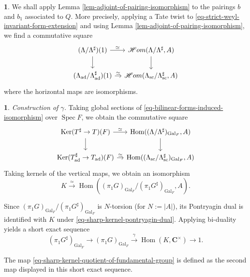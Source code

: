 \documentclass[10pt,english,reqno]{amsart}
\newcommand{\complexes}{\mathbf C}
\newcommand{\Gal}{\operatorname{Gal}}
\newcommand{\Hom}{\operatorname{Hom}}
\newcommand{\SHom}{\mathscr{H}om}
\newcommand{\Ker}{\mathrm{Ker}}
\newcommand{\Spec}{\operatorname{Spec}}
\newcommand{\sconn}{\textnormal{sc}}
\newcommand{\adjoint}{\textnormal{ad}}
\theoremstyle{definition}
\numberwithin{equation}{section}
\newtheorem{untitledsubsubsection}[subsubsection]{}
\newenvironment{void}
{\begin{untitledsubsubsection}}
{\end{untitledsubsubsection}}
\begin{document}

\begin{void}
We shall apply Lemma \ref{lem-adjoint-of-pairing-isomorphism} to the pairings $b$ and $b_1$ associated to $Q$. More precisely, applying a Tate twist to \eqref{eq-strict-weyl-invariant-form-extension} and using Lemma \ref{lem-adjoint-of-pairing-isomorphism}, we find a commutative square
\begin{equation}
\label{eq-bilinear-forms-induced-isomorphism}
\begin{tikzcd}[column sep = 1em]
	(\Lambda/\Lambda^{\sharp})(1) \ar[r, "\simeq"]\ar[d] & \SHom(\Lambda/\Lambda^{\sharp}, A) \ar[d] \\
	(\Lambda_{\adjoint}/\Lambda^{\sharp}_{\adjoint})(1) \ar[r, "\simeq"] & \SHom(\Lambda_{\sconn}/\Lambda^{\sharp}_{\sconn}, A)
\end{tikzcd}
\end{equation}
where the horizontal maps are isomorphisms.
\end{void}


\begin{void}\emph{Construction of $\gamma$.}
Taking global sections of \eqref{eq-bilinear-forms-induced-isomorphism} over $\Spec F$, we obtain the commutative square
$$
\begin{tikzcd}[column sep = 1em]
	\Ker(T^{\sharp} \rightarrow T)(F) \ar[r, "\simeq"]\ar[d] & \Hom((\Lambda/\Lambda^{\sharp})_{\Gal_F}, A) \ar[d] \\
	\Ker(T_{\adjoint}^{\sharp} \rightarrow T_{\adjoint})(F) \ar[r, "\simeq"] & \Hom((\Lambda_{\sconn}/\Lambda_{\sconn}^{\sharp})_{\Gal_F}, A) 
\end{tikzcd}
$$
Taking kernels of the vertical maps, we obtain an isomorphism
\begin{equation}
\label{eq-sharp-kernel-pontryagin-dual}
K \xrightarrow{\simeq} \Hom((\pi_1G)_{\Gal_F}/(\pi_1G^{\sharp})_{\Gal_F}, A).
\end{equation}

Since $(\pi_1G)_{\Gal_F}/(\pi_1G^{\sharp})_{\Gal_F}$ is $N$-torsion (for $N := |A|$), its Pontryagin dual is identified with $K$ under \eqref{eq-sharp-kernel-pontryagin-dual}. Applying bi-duality yields a short exact sequence
\begin{equation}
\label{eq-sharp-kernel-pontryagin-dual-as-quotient}
(\pi_1G^{\sharp})_{\Gal_F} \rightarrow (\pi_1G)_{\Gal_F} \xrightarrow{\gamma} \Hom(K, \complexes^{\times}) \rightarrow 1.
\end{equation}

The map \eqref{eq-sharp-kernel-quotient-of-fundamental-group} is defined as the second map displayed in this short exact sequence.
\end{void}
\end{document}
